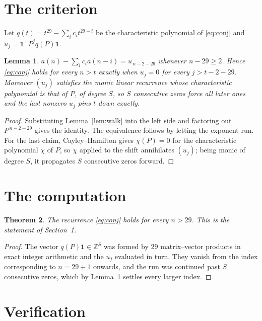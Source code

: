 \documentclass[11pt,a4paper]{article}
\theoremstyle{plain}
\newtheorem{theorem}{Theorem}
\newtheorem{lemma}[theorem]{Lemma}
\theoremstyle{definition}
\begin{document}
\section{The criterion}

Let $q(t)=t^{29}-\sum_i c_i t^{29-i}$ be the characteristic polynomial of
\eqref{eq:conj} and $u_j=\mathbf{1}^{\!\top}P^{j}q(P)\mathbf{1}$.

\begin{lemma}\label{lem:crit}
$a(n)-\sum_i c_i a(n-i)=u_{\,n-2-29}$ whenever $n-29\ge2$. Hence
\eqref{eq:conj} holds for every $n>t$ exactly when $u_j=0$ for every
$j>t-2-29$. Moreover $(u_j)$ satisfies the monic linear recurrence whose
characteristic polynomial is that of $P$, of degree $S$, so $S$ consecutive zeros force all
later ones and the last nonzero $u_j$ pins $t$ down exactly.
\end{lemma}

\begin{proof}
Substituting Lemma~\ref{lem:walk} into the left side and factoring out
$P^{\,n-2-29}$ gives the identity. The equivalence follows by letting the exponent
run. For the last claim, Cayley--Hamilton gives $\chi(P)=0$ for the characteristic
polynomial $\chi$ of $P$, so $\chi$ applied to the shift annihilates $(u_j)$; being monic of
degree $S$, it propagates $S$ consecutive zeros forward.
\end{proof}

\section{The computation}

\begin{theorem}
The recurrence \eqref{eq:conj} holds for every $n>29$. This is the statement of
Section~1.
\end{theorem}

\begin{proof}
The vector $q(P)\mathbf{1}\in\mathbb{Z}^{S}$ was formed by $29$ matrix--vector
products in exact integer arithmetic and the $u_j$ evaluated in turn. They vanish from the
index corresponding to $n=29+1$ onwards, and the run was continued past $S$ consecutive
zeros, which by Lemma~\ref{lem:crit} settles every larger index.
\end{proof}

\section{Verification}
\end{document}
